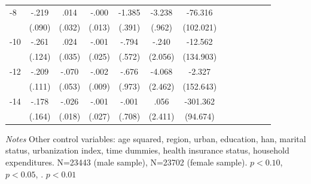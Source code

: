 \begin{table}[p]
\begin{adjustbox}{max width=\linewidth}
\begin{threeparttable}
{\begin{tabular}{l*{6}{S S}}
-8             &    -.219\sym{**} &     .014         &    -.000         &   -1.385\sym{***}&   -3.238\sym{***}&  -76.316         \\
                &   (.090)         &   (.032)         &   (.013)         &   (.391)         &   (.962)         &(102.021)         \\
-10            &    -.261\sym{**} &     .024         &    -.001         &    -.794         &    -.240         &  -12.562         \\
                &   (.124)         &   (.035)         &   (.025)         &   (.572)         &  (2.056)         &(134.903)         \\
-12           &    -.209\sym{*}  &    -.070         &    -.002         &    -.676         &   -4.068\sym{*}  &   -2.327         \\
                &   (.111)         &   (.053)         &   (.009)         &   (.973)         &  (2.462)         &(152.643)         \\
-14           &    -.178         &    -.026         &    -.001         &    -.001         &     .056         & -301.362\sym{***}\\
                &   (.164)         &   (.018)         &   (.027)         &   (.708)         &  (2.411)         & (94.674)         \\     
\bottomrule
\end{tabular}
\begin{tablenotes}
\item \textit{Notes} Other control variables: age squared, region, urban, education, han, marital status, urbanization index, time dummies, health insurance status, household expenditures. N=23443 (male sample), N=23702 (female sample). \sym{*} \(p<0.10\), \sym{**} \(p<0.05\), \sym{***}. \(p<0.01\)
\end{tablenotes}
}
\end{threeparttable}
\end{adjustbox}
\end{table}


